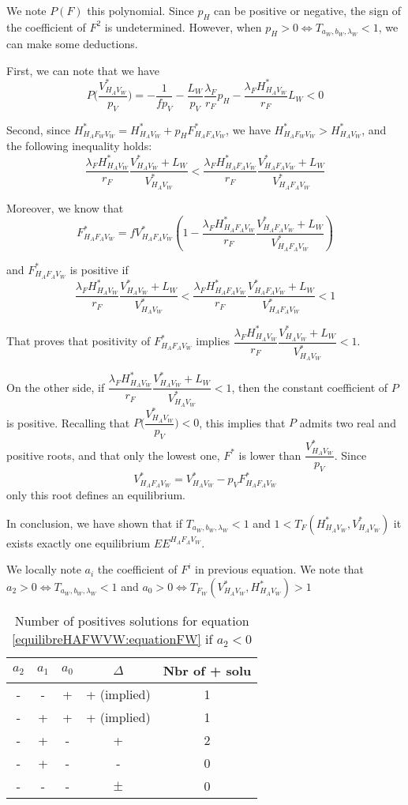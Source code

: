\documentclass{article}
\newcommand{\lfw}{\lambda_{F}}
\newcommand{\lfv}{\lambda_{W}}
\begin{document}
\begin{appendices}
We note $P(F)$ this polynomial. Since $p_H$ can be positive or negative, the sign of the coefficient of $F^2$ is undetermined. However, when $p_H > 0 \Leftrightarrow T_{a_W, b_W,\lfv} <1$, we can make some deductions.

First, we can note that we have
$$
P \Big(\dfrac{V^*_{H_AV_W}}{p_V} \Big) = - \dfrac{1}{fp_V} - \dfrac{L_W}{p_V} \dfrac{\lfw}{r_F}p_H - \dfrac{\lfw H^*_{H_AV_W}}{r_F}L_W < 0
$$


Second, since $H^*_{H_AF_WV_W} = H^*_{H_AV_W} + p_H F^*_{H_AF_AV_W}$, we have $H^*_{H_AF_WV_W} > H^*_{H_AV_W}$, and the following inequality holds:
$$
\dfrac{\lfw H^*_{H_AV_W}}{r_F} \dfrac{V^*_{H_AV_W} + L_W}{V^*_{H_AV_W}} < \dfrac{\lfw H^*_{H_AF_AV_W}}{r_F} \dfrac{V^*_{H_AF_AV_W} + L_W}{V^*_{H_AF_AV_W}}
$$


Moreover, we know that 
$$
F^*_{H_AF_AV_W} = f V^*_{H_AF_AV_W} \left(1 - \dfrac{\lfw H^*_{H_AF_AV_W}}{r_F} \dfrac{V^*_{H_AF_AV_W} + L_W}{V^*_{H_AF_AV_W}} \right)
$$

and $F^*_{H_AF_AV_W}$ is positive if 
$$
\dfrac{\lfw H^*_{H_AV_W}}{r_F} \dfrac{V^*_{H_AV_W} + L_W}{V^*_{H_AV_W}} < \dfrac{\lfw H^*_{H_AF_AV_W}}{r_F} \dfrac{V^*_{H_AF_AV_W} + L_W}{V^*_{H_AF_AV_W}} < 1
$$

That proves that positivity of $F^*_{H_AF_AV_W}$ implies $\dfrac{\lfw H^*_{H_AV_W}}{r_F} \dfrac{V^*_{H_AV_W} + L_W}{V^*_{H_AV_W}} < 1$.


On the other side, if $\dfrac{\lfw H^*_{H_AV_W}}{r_F} \dfrac{V^*_{H_AV_W} + L_W}{V^*_{H_AV_W}} < 1$, then the constant coefficient of $P$ is positive. Recalling that $P\Big(\dfrac{V^*_{H_AV_W}}{p_V} \Big) <0$, this implies that $P$ admits two real and positive roots, and that only the lowest one, $F^*$ is lower than $\dfrac{V^*_{H_AV_W}}{p_V}$. Since
$$
V^*_{H_AF_AV_W} = V^*_{H_AV_W} - p_V F^*_{H_AF_AV_W}
$$
only this root defines an equilibrium.

In conclusion, we have shown that if $T_{a_W, b_W,\lfv} <1$ and $1 < T_F(H^*_{H_AV_W}, V^*_{H_AV_W})$ it exists exactly one equilibrium $EE^{H_AF_AV_W}$.

\bigskip
We locally note $a_i$ the coefficient of $F^i$ in previous equation. We note that $a_2 > 0 \Leftrightarrow T_{a_W, b_W,\lfv} <1$ and $a_0 > 0 \Leftrightarrow T_{F_W}(V^*_{H_AV_W}, H^*_{H_AV_W}) > 1$

\begin{table}[!ht]
\caption{Number of positives solutions for equation \eqref{equilibreHAFWVW:equationFW} if $a_2 < 0$}
\centering
\begin{tabular}{c|c|c|c|c}
$a_2$ & $a_1$ & $a_0$ & $\Delta$ & Nbr of + solu \\
\hline
- & - & + & + (implied) &1 \\
- & + & + & + (implied) &1 \\
- & + & - & + & 2 \\
- & + & - & - & 0 \\
- & - & - & $\pm$ & 0
\end{tabular}
\end{table}


\end{appendices}
\end{document}
